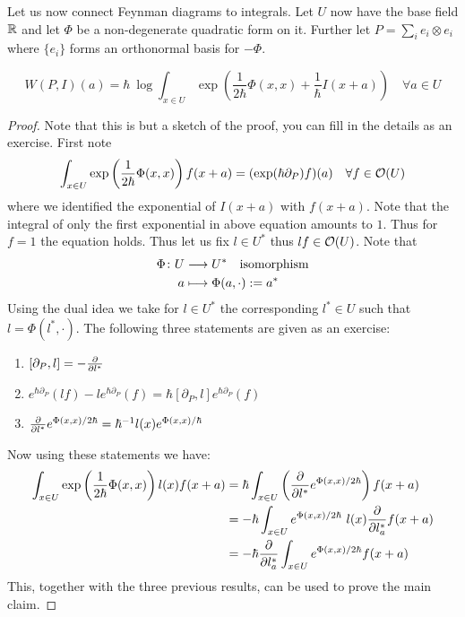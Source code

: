 Let us now connect Feynman diagrams to integrals. Let $U$ now have the base field $\mathbb{R}$ and let $\Phi$ be a non-degenerate quadratic form on it. Further let $P = \sum_i e_i \otimes e_i$ where $\{e_i\}$ forms an orthonormal basis for $- \Phi$.

\begin{prop}
  $$ W(P,I)(a) = \hbar \ \log \int_{x \in U} \exp\left( \frac{1}{2\hbar} \Phi(x,x) + \frac{1}{\hbar} I(x+a) \right) \quad \forall a \in U $$
\begin{proof}
  Note that this is but a sketch of the proof, you can fill in the details as an exercise. First note
  $$ \int_{x \in U} \exp\left( \frac{1}{2\hbar} \Phi(x,x) \right) f(x+a) = (\exp(\hbar \partial_P) f) (a) \quad \forall f \in \mathcal{O}(U) $$
  where we identified the exponential of $I(x+a)$ with $f(x+a)$. Note that the integral of only the first exponential in above equation amounts to $1$. Thus for $f = 1$ the equation holds. Thus let us fix $l \in U^*$ thus $lf \in \mathcal{O}(U)$. Note that
  \begin{align}
    \Phi \colon U &\longrightarrow U^* \quad \text{isomorphism}\\
    a &\longmapsto \Phi(a, \cdot) := a^*
  \end{align}
  Using the dual idea we take for $l \in U^*$ the corresponding $l^* \in U$ such that $l = \Phi(l^*, \cdot)$. The following three statements are given as an exercise:
  \begin{enumerate}
    \item $[\partial_P, l] = - \frac{\partial }{\partial l^*}$
    \item $e^{\hbar \partial_P}(lf) - l e^{\hbar \partial_P} (f) = \hbar [\partial_P, l] e^{\hbar \partial_P}(f)$
    \item $\frac{\partial }{\partial l^*} e^{\Phi(x,x)/2\hbar} = \hbar^{-1} l(x) e^{\Phi(x,x)/\hbar}$
  \end{enumerate}
  Now using these statements we have:
  \begin{align}
    \int_{x \in U} \exp\left( \frac{1}{2\hbar} \Phi(x,x) \right) l(x) f(x+a) &= \hbar \int_{x \in U} \left( \frac{\partial }{\partial l^*} e^{\Phi(x,x)/2\hbar} \right) f(x+a) \\
    &= - \hbar \int_{x \in U} e^{\Phi(x,x)/2\hbar} \ l(x) \frac{\partial }{\partial l_a^*} f(x+a) \\
    &= - \hbar \frac{\partial }{\partial l_a^*} \int_{x \in U} e^{\Phi(x,x)/2\hbar} f(x+a)
  \end{align}
  This, together with the three previous results, can be used to prove the main claim.
\end{proof}
\end{prop}

